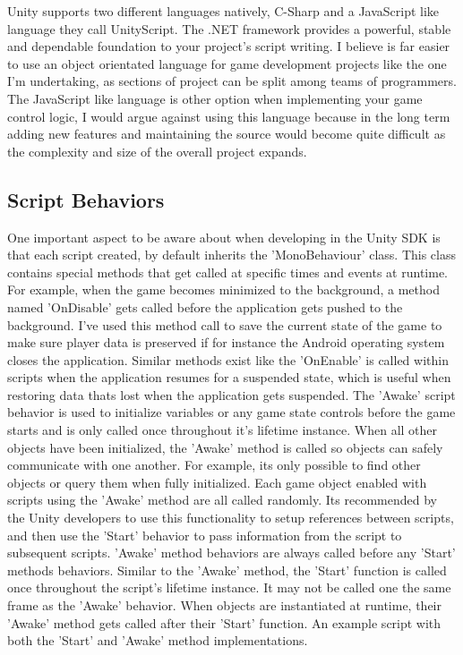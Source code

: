 Unity supports two different languages natively, C-Sharp and a JavaScript like language they call UnityScript. The .NET framework provides a powerful, stable and dependable foundation to your project's script writing. I believe is far easier to use an object orientated language for game development projects like the one I'm undertaking, as sections of project can be split among teams of programmers. 
The JavaScript like language is other option when implementing your game control logic, I would argue against using this language because in the long term adding new features and maintaining the source would become quite difficult as the complexity and size of the overall project expands.
\subsection{Script Behaviors}
One important aspect to be aware about when developing in the Unity SDK is that each script created, by default inherits the 'MonoBehaviour' class. This class contains special methods that get called at specific times and events at runtime. For example, when the game becomes minimized to the background, a method named 'OnDisable' gets called before the application gets pushed to the background. I've used this method call to save the current state of the game to make sure player data is preserved if for instance the Android operating system closes the application. Similar methods exist like the 'OnEnable' is called within scripts when the application resumes for a suspended state, which is useful when restoring data thats lost when the application gets suspended.
The 'Awake' script behavior is used to initialize variables or any game state controls before the game starts and is only called once throughout it's lifetime instance. When all other objects have been initialized, the 'Awake' method is called so objects can safely communicate with one another. For example, its only possible to find other objects or query them when fully initialized. Each game object enabled with scripts using the 'Awake' method are all called randomly. Its recommended by the Unity developers to use this functionality to setup references between scripts, and then use the 'Start' behavior to pass information from the script to subsequent scripts. 'Awake' method behaviors are always called before any 'Start' methods behaviors. Similar to the 'Awake' method, the 'Start' function is called once throughout the script's lifetime instance. It may not be called one the same frame as the 'Awake' behavior. When objects are instantiated at runtime, their 'Awake' method gets called after their 'Start' function. An example script with both the 'Start' and 'Awake' method implementations.

